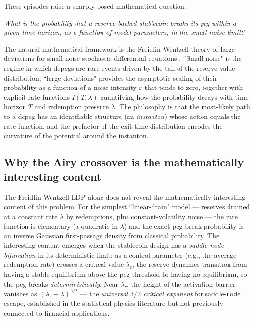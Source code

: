 \documentclass[11pt,a4paper]{article}
\theoremstyle{plain}
\theoremstyle{definition}
\begin{document}
These episodes raise a sharply posed mathematical question:
\begin{center}
\emph{What is the probability that a reserve-backed stablecoin breaks its peg within a given time horizon, as a function of model parameters, in the small-noise limit?}
\end{center}
The natural mathematical framework is the Freidlin-Wentzell theory of large deviations for small-noise stochastic differential equations \cite{FreidlinWentzell2012, DemboZeitouni2010}.
``Small noise" is the regime in which depegs are rare events driven by the tail of the reserve-value distribution; ``large deviations" provides the asymptotic scaling of their probability as a function of a noise intensity $\varepsilon$ that tends to zero, together with explicit rate functions $I(T,\lambda)$ quantifying how the probability decays with time horizon $T$ and redemption pressure $\lambda$.
The philosophy is that the most-likely path to a depeg has an identifiable structure (an \emph{instanton}) whose action equals the rate function, and the prefactor of the exit-time distribution encodes the curvature of the potential around the instanton.

\subsection{Why the Airy crossover is the mathematically interesting content}

The Freidlin-Wentzell LDP alone does not reveal the mathematically interesting content of this problem.
For the simplest ``linear-drain" model --- reserves drained at a constant rate $\lambda$ by redemptions, plus constant-volatility noise --- the rate function is elementary (a quadratic in $\lambda$) and the exact peg-break probability is an inverse Gaussian first-passage density from classical probability.
The interesting content emerges when the stablecoin design has a \emph{saddle-node bifurcation} in its deterministic limit: as a control parameter (e.g., the average redemption rate) crosses a critical value $\lambda_c$, the reserve dynamics transition from having a stable equilibrium above the peg threshold to having no equilibrium, so the peg breaks \emph{deterministically}.
Near $\lambda_c$, the height of the activation barrier vanishes as $(\lambda_c - \lambda)^{3/2}$ --- the \emph{universal $3/2$ critical exponent} for saddle-node escape, established in the statistical physics literature \cite{DykmanMoriRossHunt1994, BerglundGentz2006, AssafMeerson2010} but not previously connected to financial applications.
\end{document}
